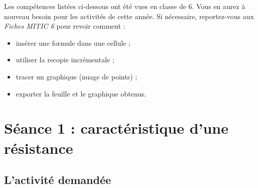 
Les compétences listées ci-dessous ont été vues en classe de 6. Vous en aurez à nouveau besoin pour les activités de cette année. Si nécessaire, reportez-vous aux \emph{Fiches MITIC 6} pour revoir comment :  

\begin{itemize}
\item insérer une formule dans une cellule ;
\item utiliser la recopie incrémentale ;
\item tracer un graphique (nuage de points) ;
\item exporter la feuille et le graphique obtenus.
\end{itemize}



%
%
%
%




\section{Séance 1 : caractéristique d'une résistance}\label{ficheTableur5e1}


\vspace{10pt}

\subsection{L'activité demandée}

